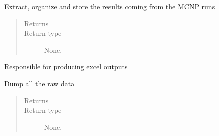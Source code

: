 \documentclass[letterpaper,10pt,english]{sphinxmanual}
\begin{document}
\begin{fulllineitems}
\begin{fulllineitems}
\label{\detokenize{api/postprocessing:expoutput.ExperimentalOutput._extract_outputs}}
\sphinxAtStartPar
Extract, organize and store the results coming from the MCNP runs
\begin{quote}\begin{description}
\item[{Returns}] \leavevmode
\sphinxAtStartPar


\item[{Return type}] \leavevmode
\sphinxAtStartPar
None.

\end{description}\end{quote}

\end{fulllineitems}


\begin{fulllineitems}
\label{\detokenize{api/postprocessing:expoutput.ExperimentalOutput._pp_excel_comparison}}
\sphinxAtStartPar
Responsible for producing excel outputs

\end{fulllineitems}


\begin{fulllineitems}
\label{\detokenize{api/postprocessing:expoutput.ExperimentalOutput._print_raw}}
\sphinxAtStartPar
Dump all the raw data
\begin{quote}\begin{description}
\item[{Returns}] \leavevmode
\sphinxAtStartPar


\item[{Return type}] \leavevmode
\sphinxAtStartPar
None.

\end{description}\end{quote}


\end{fulllineitems}
\end{fulllineitems}
\end{document}
